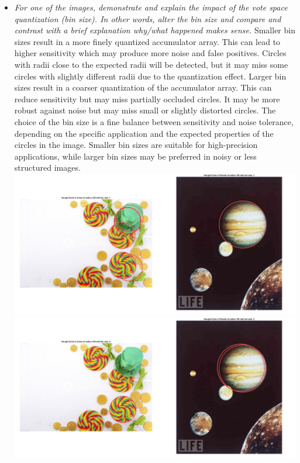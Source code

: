 \documentclass[11pt]{article}
\begin{document}
\begin{itemize}
        \item \textit{For one of the images, demonstrate and explain the impact of the vote space quantization (bin
        size). In other words, alter the bin size and compare and contrast with a brief explanation why/what happened
        makes sense.}\newline
        Smaller bin sizes result in a more finely quantized accumulator array. This can lead to higher sensitivity
        which may produce more noise and false positives. Circles with radii close to the expected radii will be
        detected, but it may miss some circles with slightly different radii due to the quantization effect.
        Larger bin sizes result in a coarser quantization of the accumulator array. This can reduce sensitivity but
        may miss partially occluded circles. It may be more robust against noise but may miss small or slightly
        distorted circles.\newline
        The choice of the bin size is a fine balance between sensitivity and noise tolerance, depending on the specific
        application and the expected properties of the circles in the image.
        Smaller bin sizes are suitable for high-precision applications,
        while larger bin sizes may be preferred in noisy or less structured images.\newline
        \includegraphics[width=\textwidth]{Output Pictures/binsize_1}\newline
        \includegraphics[width=\textwidth]{Output Pictures/binsize_2}\newline

\end{itemize}
\end{document}
